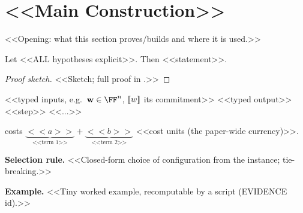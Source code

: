\section{<<Main Construction>>}\label{sec:construction}
<<Opening: what this section proves/builds and where it is used.>>

\begin{theorem}[<<name>>]\label{thm:main}
Let <<ALL hypotheses explicit>>. Then <<statement>>.
\end{theorem}
\begin{proof}[Proof sketch]
<<Sketch; full proof in .>>
\end{proof}

\begin{algorithm}[t]
\footnotesize
\caption{\textsf{<<Name>>} --- <<one-line purpose>>}\label{alg:main}
\begin{algorithmic}[1]
\Require <<typed inputs, e.g.\ $\vc{w}\in\FF^{n}$, $[\![w]\!]$ its commitment>>
\Ensure <<typed output>>
\State <<step>> 
\State \Return <<...>>
\end{algorithmic}
\end{algorithm}

\begin{proposition}[Cost]\label{prop:cost}
 costs
$\underbrace{<<a>>}_{\text{<<term 1>>}}+\underbrace{<<b>>}_{\text{<<term 2>>}}$
<<cost units (the paper-wide currency)>>.
\end{proposition}

\noindent\textbf{Selection rule.} <<Closed-form choice of configuration from the instance; tie-breaking.>>

\noindent\textbf{Example.} <<Tiny worked example, recomputable by a script (EVIDENCE id).>>

